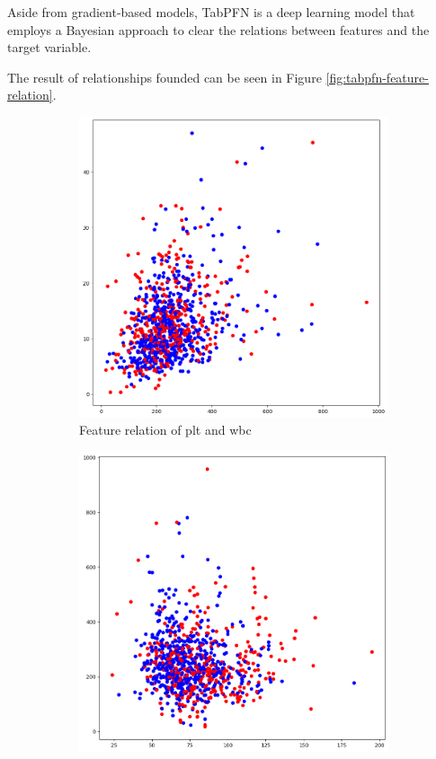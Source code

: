 \documentclass[../main.tex]{subfiles}
\begin{document}
Aside from gradient-based models, TabPFN is a deep learning model that employs a Bayesian approach to clear the relations between features and the target variable.

The result of relationships founded can be seen in Figure \ref{fig:tabpfn-feature-relation}.

\begin{figure}[H]
    \centering
    \begin{subfigure}{0.45\textwidth}
        \centering
        \includegraphics[width=\linewidth]{Figure/tabpfn-plt-wbc.png}
        \caption{Feature relation of plt and wbc}
        \label{fig:tabpfn-plt-wbc}
    \end{subfigure}
    \hfill
    \begin{subfigure}{0.45\textwidth}
        \centering
        \includegraphics[width=\linewidth]{Figure/tabpfn-weight-plt.png}

\end{subfigure}
\end{figure}
\end{document}
